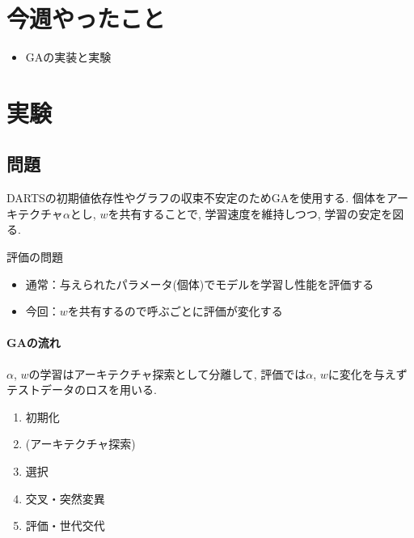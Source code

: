 \documentclass[twocolumn]{jarticle}     %
\begin{document}


\section{今週やったこと}
\begin{itemize}
  \item GAの実装と実験
\end{itemize}

\section{実験}

\subsection{問題}
DARTSの初期値依存性やグラフの収束不安定のためGAを使用する.
個体をアーキテクチャ$\alpha$とし, $w$を共有することで,
学習速度を維持しつつ, 学習の安定を図る.

評価の問題
\begin{itemize}
  \item 通常：与えられたパラメータ(個体)でモデルを学習し性能を評価する
  \item 今回：$w$を共有するので呼ぶごとに評価が変化する
\end{itemize}

\paragraph{GAの流れ}
$\alpha$, $w$の学習はアーキテクチャ探索として分離して,
評価では$\alpha$, $w$に変化を与えずテストデータのロスを用いる.
\begin{enumerate}
  \item 初期化
  \item (アーキテクチャ探索)
  \item 選択
  \item 交叉・突然変異
  \item 評価・世代交代
\end{enumerate}
\end{document}
